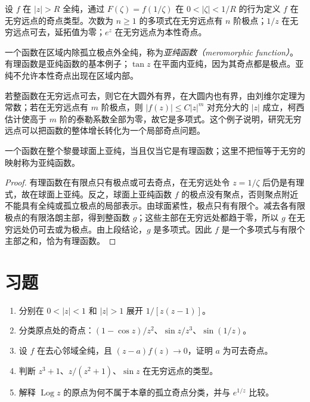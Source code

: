 设 $f$ 在 $|z|>R$ 全纯，通过 $F(\zeta)=f(1/\zeta)$ 在 $0<|\zeta|<1/R$ 的行为定义 $f$ 在无穷远点的奇点类型。次数为 $n\ge1$ 的多项式在无穷远点有 $n$ 阶极点；$1/z$ 在无穷远点可去，延拓值为零；$e^z$ 在无穷远点为本性奇点。

一个函数在区域内除孤立极点外全纯，称为\emph{亚纯函数（meromorphic function）}。有理函数是亚纯函数的基本例子；$\tan z$ 在平面内亚纯，因为其奇点都是极点。亚纯不允许本性奇点出现在区域内部。

若整函数在无穷远点可去，则它在大圆外有界，在大圆内也有界，由刘维尔定理为常数；若在无穷远点有 $m$ 阶极点，则 $|f(z)|\le C|z|^m$ 对充分大的 $|z|$ 成立，柯西估计使高于 $m$ 阶的泰勒系数全部为零，故它是多项式。这个例子说明，研究无穷远点可以把函数的整体增长转化为一个局部奇点问题。

\begin{theorem}[球面上的亚纯函数]
\label{thm:ca-sphere-rational}
一个函数在整个黎曼球面上亚纯，当且仅当它是有理函数；这里不把恒等于无穷的映射称为亚纯函数。
\end{theorem}
\begin{proof}
有理函数在有限点只有极点或可去奇点，在无穷远处令 $z=1/\zeta$ 后仍是有理式，故在球面上亚纯。反之，球面上亚纯函数 $f$ 的极点没有聚点，否则聚点附近不能具有全纯或孤立极点的局部表示。由球面紧性，极点只有有限个。减去各有限极点的有限洛朗主部，得到整函数 $g$；这些主部在无穷远处都趋于零，所以 $g$ 在无穷远处仍可去或为极点。由上段结论，$g$ 是多项式。因此 $f$ 是一个多项式与有限个主部之和，恰为有理函数。
\end{proof}

\section{习题}
\label{sec:ca-laurent-ex}
\begin{enumerate}
 \item 分别在 $0<|z|<1$ 和 $|z|>1$ 展开 $1/[z(z-1)]$。
 \item 分类原点处的奇点：$(1-\cos z)/z^2$、$\sin z/z^3$、$\sin(1/z)$。
 \item 设 $f$ 在去心邻域全纯，且 $(z-a)f(z)\to0$，证明 $a$ 为可去奇点。
 \item 判断 $z^3+1$、$z/(z^2+1)$、$\sin z$ 在无穷远点的类型。
 \item 解释 $\operatorname{Log}z$ 的原点为何不属于本章的孤立奇点分类，并与 $e^{1/z}$ 比较。
\end{enumerate}

